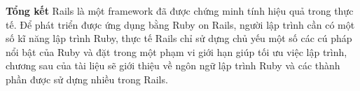 {\bf Tổng kết}\newline
Rails là một framework đã được chứng minh tính hiệu quả trong thực tế. Để phát triển được ứng dụng bằng Ruby on Rails, người lập trình cần có một số kĩ năng lập trình Ruby, thực tế Rails chỉ sử dựng chủ yếu một số các cú pháp nổi bật của Ruby và đặt trong một phạm vi giới hạn giúp tối ưu việc lập trình, chương sau của tài liệu sẽ giới thiệu về ngôn ngữ lập trình Ruby và các thành phần được sử dựng nhiều trong Rails.




